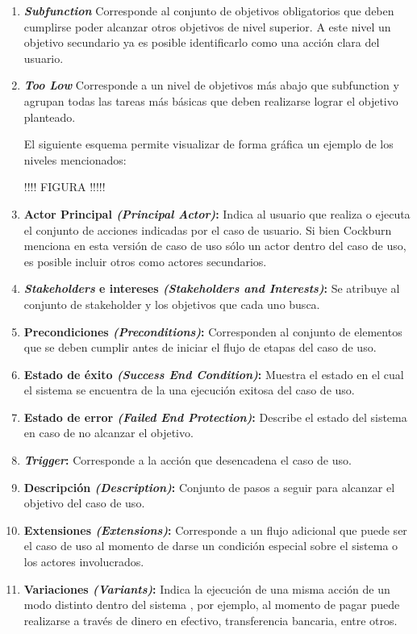 \begin{enumerate}
\begin{enumerate}
      \item \textbf{\textit{Subfunction}} Corresponde al conjunto de objetivos obligatorios que deben cumplirse poder alcanzar otros objetivos de nivel superior. A este nivel un objetivo secundario ya es posible identificarlo como una acción clara del usuario.
      \item \textbf{\textit{Too Low}} Corresponde a un nivel de objetivos más abajo que subfunction y agrupan todas las tareas más básicas que deben realizarse lograr el objetivo planteado.

      El siguiente esquema permite visualizar de forma gráfica un ejemplo de los niveles mencionados:

      !!!! FIGURA !!!!!

      \item \textbf{Actor Principal \textit{(Principal Actor)}:} Indica al usuario que realiza o ejecuta el conjunto de acciones indicadas por el caso de usuario. Si bien Cockburn menciona en esta versión de caso de uso sólo un actor dentro del caso de uso, es posible incluir otros como actores secundarios.
      \item \textbf{\textit{Stakeholders} e intereses \textit{(Stakeholders and Interests)}:} Se atribuye al conjunto de stakeholder y los objetivos que cada uno busca.
      \item \textbf{Precondiciones \textit{(Preconditions)}:} Corresponden al conjunto de elementos que se deben cumplir antes de iniciar el flujo de etapas del caso de uso.
      \item \textbf{Estado de éxito \textit{(Success End Condition)}:} Muestra el estado en el cual el sistema se encuentra de la una ejecución exitosa del caso de uso.
      \item \textbf{Estado de error \textit{(Failed End Protection)}:} Describe el estado del sistema en caso de no alcanzar el objetivo.
      \item \textbf{\textit{Trigger}:} Corresponde a la acción que desencadena  el caso de uso.
      \item \textbf{Descripción \textit{(Description)}:} Conjunto de pasos a seguir para alcanzar el objetivo del caso de uso.
      \item \textbf{Extensiones \textit{(Extensions)}:} Corresponde a un flujo adicional que puede ser el caso de uso al momento de darse un condición especial sobre el sistema o los actores involucrados.
      \item \textbf{Variaciones \textit{(Variants)}:} Indica la ejecución de una misma acción de un modo distinto dentro del sistema , por ejemplo, al momento de pagar puede realizarse a través de dinero en efectivo, transferencia bancaria, entre otros.
    \end{enumerate}
\end{enumerate}

